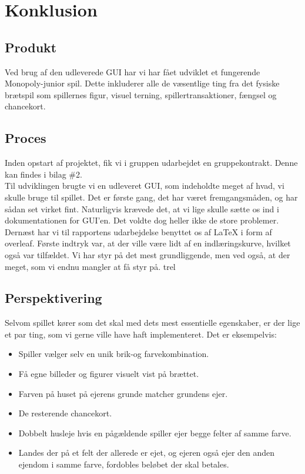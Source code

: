 \section{Konklusion}
\subsection{Produkt}
Ved brug af den udleverede GUI har vi har fået udviklet et fungerende Monopoly-junior spil. Dette inkluderer alle de væsentlige ting fra det fysiske brætspil som spillernes figur, visuel terning, spillertransaktioner, fængsel og chancekort.

\subsection{Proces}
Inden opstart af projektet, fik vi i gruppen udarbejdet en gruppekontrakt. Denne kan findes i bilag \#2.
\\Til udviklingen brugte vi en udleveret GUI, som indeholdte meget af hvad, vi skulle bruge til spillet. Det er første gang, det har været fremgangsmåden, og har sådan set virket fint. Naturligvis krævede det, at vi lige skulle sætte os ind i dokumentationen for GUI'en. Det voldte dog heller ikke de store problemer.
\\
Dernæst har vi til rapportens udarbejdelse benyttet os af LaTeX i form af overleaf. Første indtryk var, at der ville være lidt af en indlæringskurve, hvilket også var tilfældet. Vi har styr på det mest grundliggende, men ved også, at der meget, som vi endnu mangler at få styr på. 
trel
\subsection{Perspektivering}
Selvom spillet kører som det skal med dets mest essentielle egenskaber, er der lige et par ting, som vi gerne ville have haft implementeret. Det er eksempelvis:
\begin{itemize}
\item Spiller vælger selv en unik brik-og farvekombination.
\item Få egne billeder og figurer visuelt vist på brættet.
\item Farven på huset på ejerens grunde matcher grundens ejer.
\item De resterende chancekort.
\item Dobbelt husleje hvis en pågældende spiller ejer begge felter af samme farve.
\item Landes der på et felt der allerede er ejet, og ejeren også ejer den anden ejendom i samme farve, fordobles beløbet der skal betales.
\end{itemize}
